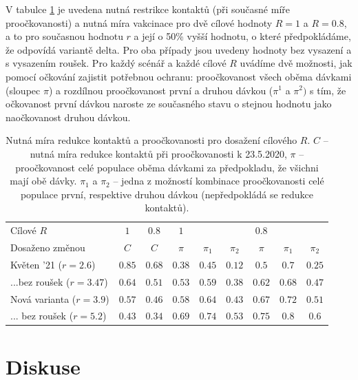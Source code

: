 V tabulce \ref{tab:res} je uvedena nutná restrikce kontaktů (při současné
míře proočkovanosti) a nutná míra vakcinace pro dvě cílové hodnoty
$R=1$ a $R=0.8$, a to pro 
současnou hodnotu $r$ a její o 50\% vyšší hodnotu, o které předpokládáme, že odpovídá variantě delta. Pro oba případy jsou uvedeny hodnoty bez vysazení a s vysazením roušek. Pro každý scénář a každé
cílové $R$ uvádíme dvě možnosti, jak pomocí očkování zajistit potřebnou ochranu:
proočkovanost všech oběma dávkami (sloupec $\pi$) a rozdílnou proočkovanost
první a druhou dávkou ($\pi^{1}$ a $\pi^{2})$ s tím, že očkovanost první dávkou naroste ze současného stavu o stejnou hodnotu jako naočkovanost druhou dávkou.
\begin{table}
\begin{center}
\begin{tabular}{l|c|c|ccc|ccc}									 Cílové $R$	& $1$	& $0.8$	& $1$	&	&	& $0.8$	&	&	\\  Dosaženo změnou	& $C$	& $C$	& $\pi$	& $\pi_1$	& $\pi_2$	& $\pi$	& $\pi_1$	& $\pi_2$	\\ \hline Květen '21 ($r=2.6$)	& $0.85$	& $0.68$	& $0.38$	& $0.45$	& $0.12$	& $0.5$	& $0.7$	& $0.25$	\\ ...bez roušek ($r=3.47$)	& $0.64$	& $0.51$	& $0.53$	& $0.59$	& $0.38$	& $0.62$	& $0.68$	& $0.47$	\\ Nová varianta ($r=3.9$)	& $0.57$	& $0.46$	& $0.58$	& $0.64$	& $0.43$	& $0.67$	& $0.72$	& $0.51$	\\ ... bez roušek ($r=5.2$)	& $0.43$	& $0.34$	& $0.69$	& $0.74$	& $0.53$	& $0.75$	& $0.8$	& $0.6$	\\ 
\end{tabular}		
\caption{Nutná míra redukce kontaktů a proočkovanosti pro dosažení cílového $R$. $C$ -- nutná míra redukce kontaktů při proočkovanosti k 23.5.2020, $\pi$ -- proočkovanost celé populace oběma dávkami za předpokladu, že všichni mají obě dávky. $\pi_1$ a $\pi_2$ -- jedna z možností kombinace proočkovanosti celé populace první, respektive druhou dávkou (nepředpokládá se redukce kontaktů). }							 	 
\label{tab:res}
\end{center}

\end{table}


\section*{Diskuse}

